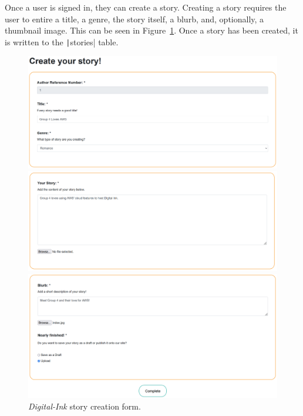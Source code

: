 \clearpage
Once a user is signed in, they can create a story.
Creating a story requires the user to entire a title, a genre, the story itself, a blurb, and, optionally, a thumbnail
image.
This can be seen in Figure~\ref{fig:digital-ink-create-story}.
Once a story has been created, it is written to the \texttt|stories| table.

\begin{figure}[!htbp]
    \centering
    \begin{subfloat}
        \includegraphics[width=\textwidth]{resources/webapp/digital-ink-create-story-1}
    \end{subfloat}
    \begin{subfloat}
        \includegraphics[width=\textwidth]{resources/webapp/digital-ink-create-story-2}
    \end{subfloat}
    \begin{subfloat}
        \includegraphics[width=\textwidth]{resources/webapp/digital-ink-create-story-3}
    \end{subfloat}
    \caption{\textit{Digital-Ink} story creation form.}
    \label{fig:digital-ink-create-story}
\end{figure}

